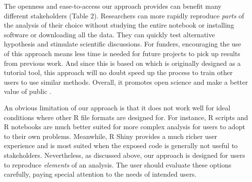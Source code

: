 The openness and ease-to-access our approach provides can benefit many
different stakeholders (Table 2). Researchers can more rapidly reproduce
\emph{parts} of the analysis of their choice without studying the entire
notebook or installing software or downloading all the data. They can
quickly test alternative hypothesis and stimulate scientific
discussions. For funders, encouraging the use of this approach means
less time is needed for future projects to pick up results from previous
work. And since this is based on \DIFdelbegin \emph{} %
\DIFdelend \DIFaddbegin {} \DIFaddend which is originally
designed as a tutorial tool, this approach will no doubt speed up the
process to train other users to use similar methods. Overall, it
promotes open science and make a better value of public \DIFdelbegin {}\DIFdelend \DIFaddbegin {}\DIFaddend .

An obvious limitation of our approach is that it does not work well for
ideal conditions where other R file formats are designed for. For
instance, R scripts and R notebooks are much better suited for more
complex analysis for users to adopt to their own problems. Meanwhile, R
Shiny \DIFaddbegin {}\DIFaddend provides a much richer user experience and is most suited
when the exposed code is generally not useful to stakeholders.
Nevertheless, as discussed above, our approach is designed for users to
reproduce \emph{elements} of an analysis. The user should evaluate these
options carefully, paying special attention to the needs of intended
users.

\DIFdelbegin %
{%
}%

{%
}

